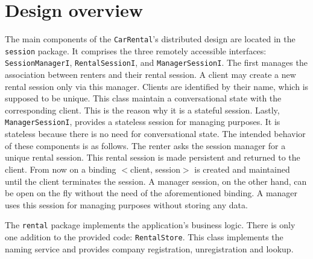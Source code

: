 \section{Design overview}
The main components of the \texttt{CarRental}'s distributed design are located in the \texttt{session} package. It comprises the three remotely accessible interfaces: \texttt{SessionManagerI}, \texttt{RentalSessionI}, and \texttt{ManagerSessionI}. The first manages the association between renters and their rental session. A client may create a new rental session only via this manager. Clients are identified by their name, which is supposed to be unique. This class maintain a conversational state with the corresponding client. This is the reason why it is a stateful session. Lastly, \texttt{ManagerSessionI}, provides a stateless session for managing purposes. It is stateless because there is no need for conversational state. The intended behavior of these components is as follows. The renter asks the session manager for a unique rental session. This rental session is made persistent and returned to the client. From now on a binding $<$client, session$>$ is created and maintained until the client terminates the session. %
A manager session, on the other hand, can be open on the fly without the need of the aforementioned binding. A manager uses this session for managing purposes without storing any data. 

The \texttt{rental} package implements the application's business logic. There is only one addition to the provided code: \texttt{RentalStore}. This class implements the naming service and provides company registration, unregistration and lookup.
